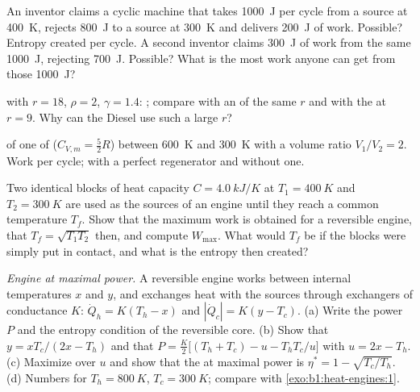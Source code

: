 \begin{exercise}[$\star\star$]\label{exo:b1:heat-engines:6}
An inventor claims a cyclic machine that takes \qty{1000}{J} per cycle
from a source at \qty{400}{K}, rejects \qty{800}{J} to a source at
\qty{300}{K} and delivers \qty{200}{J} of work. Possible? Entropy created
per cycle. A second inventor claims \qty{300}{J} of work from the same
\qty{1000}{J}, rejecting \qty{700}{J}. Possible? What is the most work
anyone can get from those \qty{1000}{J}?
\end{exercise}

\begin{exercise}[$\star\star$]\label{exo:b1:heat-engines:7}
 with $r = 18$, $\rho = 2$, $\gamma = 1.4$: ;
compare with an  of the same $r$ and with the  at
$r = 9$. Why can the Diesel use such a large $r$?
\end{exercise}

\begin{exercise}[$\star\star$]\label{exo:b1:heat-engines:8}
 of one  of  ($C_{V,m} = \tfrac52R$) between
\qty{600}{K} and \qty{300}{K} with a volume ratio $V_1/V_2 = 2$. Work per
cycle;  with a perfect regenerator and without one.
\end{exercise}

\begin{exercise}[$\star\star$]\label{exo:b1:heat-engines:9}
Two identical blocks of heat capacity $C = \qty{4.0}{kJ/K}$ at $T_1 =
\qty{400}{K}$ and $T_2 = \qty{300}{K}$ are used as the sources of an engine
until they reach a common temperature $T_f$. Show that the maximum work
is obtained for a reversible engine, that $T_f = \sqrt{T_1T_2}$ then, and
compute $W_{\max}$. What would $T_f$ be if the blocks were simply put in
contact, and what is the entropy then created?
\end{exercise}

\begin{exercise}[$\star\star\star$]\label{exo:b1:heat-engines:10}
\emph{Engine at maximal power.} A reversible engine works between
internal temperatures $x$ and $y$, and exchanges heat with the sources
through exchangers of conductance $K$: $\dot Q_h = K(T_h - x)$ and
$|\dot Q_c| = K(y - T_c)$. (a) Write the power $P$ and the entropy
condition of the reversible core. (b) Show that $y = xT_c/(2x - T_h)$ and
that $P = \frac{K}{2}\bigl[(T_h + T_c) - u - T_hT_c/u\bigr]$ with $u = 2x - T_h$.
(c) Maximize over $u$ and show that the  at maximal power is
$\eta^\ast = 1 - \sqrt{T_c/T_h}$. (d) Numbers for $T_h = \qty{800}{K}$,
$T_c = \qty{300}{K}$; compare with \cref{exo:b1:heat-engines:1}.
\end{exercise}

